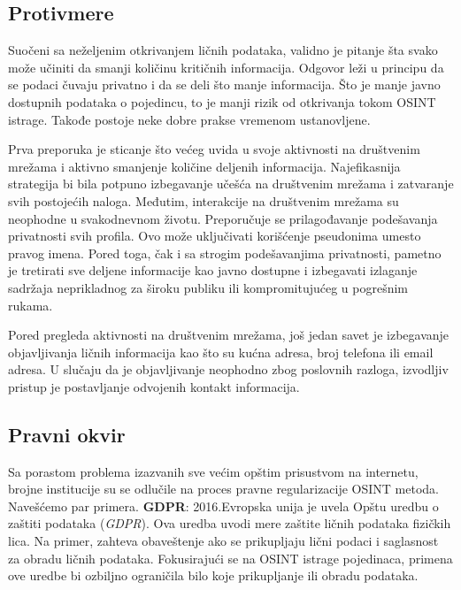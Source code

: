 \documentclass[fleqn, 12pt]{article}
\begin{document}
\subsection{Protivmere}
Suočeni sa neželjenim otkrivanjem ličnih podataka, validno je pitanje šta svako može učiniti da smanji količinu kritičnih informacija. Odgovor leži u principu da se podaci čuvaju privatno i da se deli što manje informacija. Što je manje javno dostupnih podataka o pojedincu, to je manji rizik od otkrivanja tokom OSINT istrage. Takođe postoje neke dobre prakse vremenom ustanovljene.\newline

Prva preporuka je sticanje što većeg uvida u svoje aktivnosti na društvenim mrežama i aktivno smanjenje količine deljenih informacija. Najefikasnija strategija bi bila potpuno izbegavanje učešća na društvenim mrežama i zatvaranje svih postojećih naloga. Međutim, interakcije na društvenim mrežama su neophodne u svakodnevnom životu. Preporučuje se prilagođavanje podešavanja privatnosti svih profila. Ovo može uključivati korišćenje pseudonima umesto pravog imena. Pored toga, čak i sa strogim podešavanjima privatnosti, pametno je tretirati sve deljene informacije kao javno dostupne i izbegavati izlaganje sadržaja neprikladnog za široku publiku ili kompromitujućeg u pogrešnim rukama.\newline

Pored pregleda aktivnosti na društvenim mrežama, još jedan savet je izbegavanje objavljivanja ličnih informacija kao što su kućna adresa, broj telefona ili email adresa. U slučaju da je objavljivanje neophodno zbog poslovnih razloga, izvodljiv pristup je postavljanje odvojenih kontakt informacija.
\subsection{Pravni okvir}
Sa porastom problema izazvanih sve većim opštim prisustvom na internetu, brojne institucije su se odlučile na proces pravne regularizacije OSINT metoda. Navešćemo par primera. \newline \newline
  \indent \textbf{GDPR}: 2016.Evropska unija je uvela Opštu uredbu o zaštiti podataka (\textit{GDPR}). Ova uredba uvodi mere zaštite ličnih podataka fizičkih lica. Na primer, zahteva obaveštenje ako se prikupljaju lični podaci i saglasnost za obradu ličnih podataka. Fokusirajući se na OSINT istrage pojedinaca, primena ove uredbe bi ozbiljno ograničila bilo koje prikupljanje ili obradu podataka.\newpage
\end{document}
